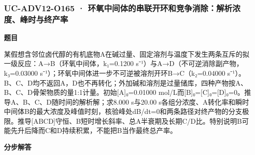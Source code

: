 \documentclass[UTF8,11pt,a4paper]{ctexart}
\begin{document}
\subsubsection*{UC-ADV12-O165 · 环氧中间体的串联开环和竞争消除：解析浓度、峰时与终产率}
\noindent\textbf{题目}\par
某假想含邻位卤代醇的有机底物A在碱过量、固定溶剂与温度下发生两条互斥的拟一级反应：A→B（环氧中间体，k₁=0.1200 s⁻¹）与A→D（不可逆消除副产物，k₃=0.03000 s⁻¹）；环氧中间体进一步不可逆被溶剂开环B→C（k₂=0.04000 s⁻¹）。B、C、D均不返回A，D也不再转化；外加碱和溶剂是过量储库，四种产物按A、B、C、D骨架物质的量1:1计量。初始[A]₀=0.01000 mol/L而[B]₀=[C]₀=[D]₀=0。推导A、B、C、D随时间的解析解；求8.000 s与20.00 s各组分浓度、A转化率和瞬时中间体B的最大浓度及峰值时刻，核验峰处dB/dt=0和两条路径对终产物的分支极限。推导[ABCD]守恒、B短时增长斜率、总A半衰期及长期C/D比。特别说明B可能先升后降而C和D持续积累，不能把B当作最终总产率。\par
\medskip\noindent\textbf{分步解答}
\end{document}
